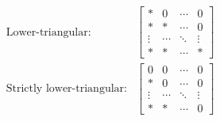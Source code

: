 \begin{dfn}{}{}
\begin{rmk}
\begin{subequations}
\begin{align*}
			\text{Lower-triangular:} & \begin{bmatrix}* & 0 & \cdots & 0 \\ * & * & \cdots & 0 \\ \vdots & \cdots & \ddots & \vdots \\ * & * & \cdots & *\end{bmatrix} \\
			\text{Strictly lower-triangular:} & \begin{bmatrix}0 & 0 & \cdots & 0 \\ * & 0 & \cdots & 0 \\ \vdots & \cdots & \ddots & \vdots \\ * & * & \cdots & 0\end{bmatrix}
			\end{align*}
		\end{subequations}
	\end{rmk}
\end{dfn}

